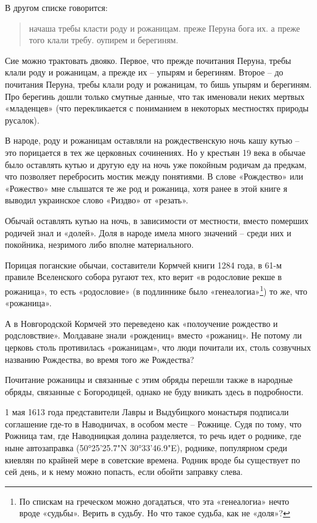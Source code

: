В другом списке говорится: 

\begin{quotation}
начаша требы класти роду и рожаницам. преже Перуна бога их. а преже того клали требу. оупирем и берегиням.
\end{quotation}

Сие можно трактовать двояко. Первое, что прежде почитания Перуна, требы клали роду и рожаницам, а прежде их – упырям и берегиням. Второе – до почитания Перуна, требы клали роду и рожаницам, то бишь упырям и берегиням. Про берегинь дошли только смутные данные, что так именовали неких мертвых «младенцев» (что перекликается с пониманием в некоторых местностях природы русалок).

В народе, роду и рожаницам оставляли на рождественскую ночь кашу кутью – это порицается в тех же церковных сочинениях. Но у крестьян 19 века в обычае было оставлять кутью и другую еду на ночь уже покойным родичам да предкам, что позволяет перебросить мостик между понятиями. В слове «Рождество» или «Рожество» мне слышатся те же род и рожаница, хотя ранее в этой книге я выводил украинское слово «Риздво» от «резать».%

Обычай оставлять кутью на ночь, в зависимости от местности, вместо померших родичей знал и «долей». Доля в народе имела много значений – среди них и покойника, незримого либо вполне материального.

Порицая поганские обычаи, составители Кормчей книги 1284 года, в 61-м правиле Вселенского собора ругают тех, кто верит «в родословие рекше в рожаница», то есть «родословие» (в подлиннике было «генеалогиа»\footnote{По спискам на греческом можно догадаться, что эта «генеалогиа» нечто вроде «судьбы». Верить в судьбу. Но что такое судьба, как не «доля»?}) то же, что «рожаница».

А в Новгородской Кормчей это переведено как «полоучение рождество и родсловствие». Молдаване знали «рождениц» вместо «рожаниц». Не потому ли церковь столь противилась «рожаницам», что люди почитали их, столь созвучных названию Рождества, во время того же Рождества?

Почитание рожаницы и связанные с этим обряды перешли также в народные обряды, связанные с Богородицей, однако не буду вникать здесь в подробности.

1 мая 1613 года представители Лавры и Выдубицкого монастыря подписали соглашение где-то в Наводничах, в особом месте – Рожнице. Судя по тому, что Рожница там, где Наводницкая долина разделяется, то речь идет о роднике, где ныне автозаправка (50°25'25.7"N 30°33'46.9"E), роднике, популярном среди киевлян по крайней мере в советские времена. Родник вроде бы существует по сей день, и к нему можно попасть, если обойти заправку слева.


